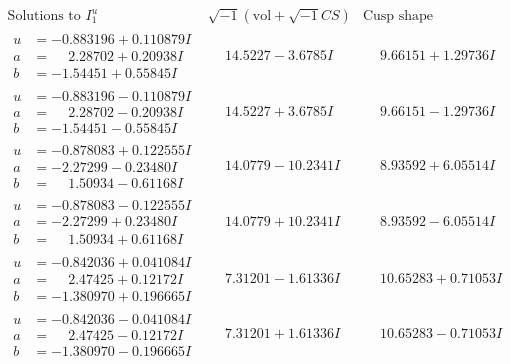 \documentclass[1p]{elsarticle_modified}
\theoremstyle{definition}
\newcommand{\I}{\sqrt{-1}}
\begin{document}
$$\begin{array}{c|c|c}  
\text{Solutions to }I^u_{1}& \I (\text{vol} + \sqrt{-1}CS) & \text{Cusp shape}\\
 \hline 
\begin{aligned}
u &= -0.883196 + 0.110879 I \\
a &= \phantom{-}2.28702 + 0.20938 I \\
b &= -1.54451 + 0.55845 I\end{aligned}
 & \phantom{-}14.5227 - 3.6785 I & \phantom{-}9.66151 + 1.29736 I \\ \hline\begin{aligned}
u &= -0.883196 - 0.110879 I \\
a &= \phantom{-}2.28702 - 0.20938 I \\
b &= -1.54451 - 0.55845 I\end{aligned}
 & \phantom{-}14.5227 + 3.6785 I & \phantom{-}9.66151 - 1.29736 I \\ \hline\begin{aligned}
u &= -0.878083 + 0.122555 I \\
a &= -2.27299 - 0.23480 I \\
b &= \phantom{-}1.50934 - 0.61168 I\end{aligned}
 & \phantom{-}14.0779 - 10.2341 I & \phantom{-}8.93592 + 6.05514 I \\ \hline\begin{aligned}
u &= -0.878083 - 0.122555 I \\
a &= -2.27299 + 0.23480 I \\
b &= \phantom{-}1.50934 + 0.61168 I\end{aligned}
 & \phantom{-}14.0779 + 10.2341 I & \phantom{-}8.93592 - 6.05514 I \\ \hline\begin{aligned}
u &= -0.842036 + 0.041084 I \\
a &= \phantom{-}2.47425 + 0.12172 I \\
b &= -1.380970 + 0.196665 I\end{aligned}
 & \phantom{-}7.31201 - 1.61336 I & \phantom{-}10.65283 + 0.71053 I \\ \hline\begin{aligned}
u &= -0.842036 - 0.041084 I \\
a &= \phantom{-}2.47425 - 0.12172 I \\
b &= -1.380970 - 0.196665 I\end{aligned}
 & \phantom{-}7.31201 + 1.61336 I & \phantom{-}10.65283 - 0.71053 I \\ \hline\begin{aligned}

\end{aligned}
\end{array}$$
\end{document}
